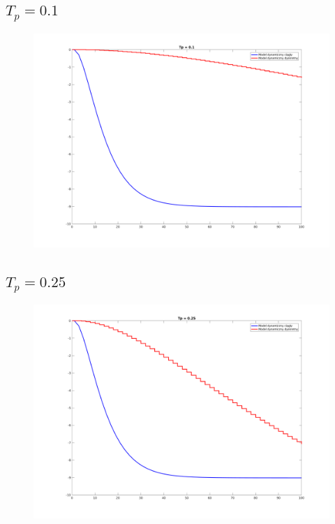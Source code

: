 \documentclass[a4paper, 11pt]{article}
\begin{document}
\subsection{$T_p = 0.1$}
\begin{figure}[H]
\centering
\includegraphics[scale=0.45]{tp_01.png}
\end{figure}
\subsection{$T_p = 0.25$}
\begin{figure}[H]
\centering
\includegraphics[scale=0.45]{tp_025.png}
\end{figure}
\end{document}
